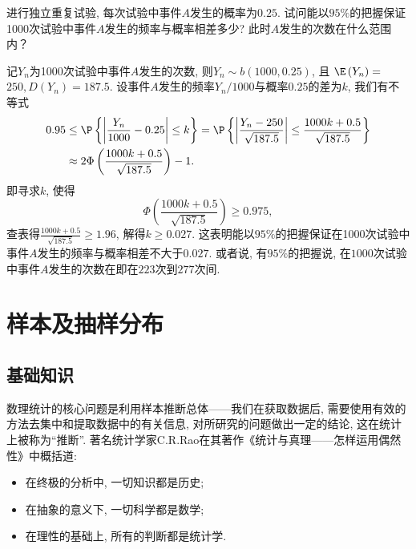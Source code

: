 \documentclass[11pt]{ctexart}
\begin{document}
\begin{example}
	进行独立重复试验, 每次试验中事件$A$发生的概率为$0.25$. 
	试问能以$95 \%$的把握保证1000次试验中事件$A$发生的频率与概率相差多少? 
	此时$A$发生的次数在什么范围内？
\end{example}
\begin{solution}
	记$Y_n$为1000次试验中事件$A$发生的次数, 则$Y_n \sim b(1000,0.25)$, 且 $\E\left(Y_n\right)=$ $250, D\left(Y_n\right)=187.5$.
	设事件$A$发生的频率$Y_n / 1000$与概率$0.25$的差为$k$, 我们有不等式
	\begin{align*}
		0.95 
		&\leq \P\left\{\left|\frac{Y_n}{1000}-0.25\right| \leq k\right\} 
		= \P \left\{\left|\frac{Y_n - 250}{\sqrt{187.5}}\right| \leq \frac{1000k + 0.5}{\sqrt{187.5}} \right\} \\
		&\approx 2 \Phi \left(\frac{1000k + 0.5}{\sqrt{187.5}}\right) - 1. 
	\end{align*}
	即寻求$k$, 使得
	\begin{equation*}
		\Phi \left(\frac{1000k + 0.5}{\sqrt{187.5}}\right) \geq 0.975, 
	\end{equation*}
	查表得$\frac{1000k + 0.5}{\sqrt{187.5}} \geq 1.96$, 解得$k \geq 0.027$. 
	这表明能以$95 \%$的把握保证在1000次试验中事件$A$发生的频率与概率相差不大于$0.027$.  
	或者说, 有$95 \%$的把握说, 在$1000$次试验中事件$A$发生的次数在即在$223$次到$277$次间.
\end{solution}





\section{样本及抽样分布}

\subsection{基础知识}

数理统计的核心问题是利用样本推断总体——我们在获取数据后, 需要使用有效的方法去集中和提取数据中的有关信息, 对所研究的问题做出一定的结论, 这在统计上被称为“推断”. 
著名统计学家C.R.Rao在其著作《统计与真理——怎样运用偶然性》中概括道: 
\begin{itemize}
	\item 在终极的分析中, 一切知识都是历史;
	\item 在抽象的意义下, 一切科学都是数学;
	\item 在理性的基础上, 所有的判断都是统计学. 
\end{itemize}
\end{document}
